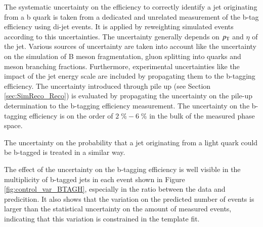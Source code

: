 The systematic uncertainty on the efficiency to correctly identify a jet originating from a b quark is taken from a dedicated and unrelated measurement of the b-tag efficiency \cite{BTV16002} using di-jet events. It is applied by reweighting simulated events according to this uncertainties. The uncertainty generally depends on $p_{\mathrm{T}}$ and $\eta$ of the jet.
Various sources of uncertainty are taken into account like the uncertainty on the simulation of B meson fragmentation, gluon splitting into quarks and meson branching fractions.
Furthermore, experimental uncertainties like the impact of the jet energy scale are included by propagating them to the b-tagging efficiency. The uncertainty introduced through pile up (see Section \ref{sec:SimReco_Reco}) is evaluated by propagating the uncertainty
on the pile-up determination to the b-tagging efficiency measurement.
The uncertainty on the b-tagging efficiency is on the order of $2 \; \% - 6 \; \%$ in the bulk of the measured phase space.

The uncertainty on the probability that a jet originating from a light quark could be b-tagged is treated in a similar way.

The effect of the uncertainty on the b-tagging efficiency is well visible in the multiplicity of b-tagged jets in each event shown in Figure \ref{fig:control_var_BTAGH}, especially in the ratio between the data and predicition.
It also shows that the variation on the predicted number of events is larger than the statistical uncertainty on the amount of measured events, indicating that this variation is constrained in the
template fit.

